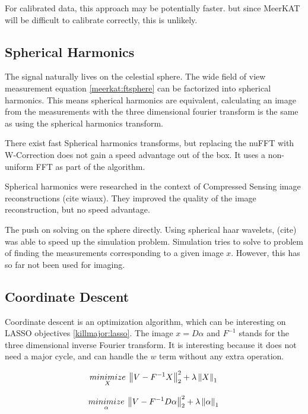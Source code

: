 For calibrated data, this approach may be potentially faster. but since MeerKAT will be difficult to calibrate correctly, this is unlikely.


\subsection{Spherical Harmonics}
The signal naturally lives on the celestial sphere. The wide field of view measurement equation \eqref{meerkat:ftsphere} can be factorized into spherical harmonics. This means spherical harmonics are equivalent, calculating an image from the measurements with the three dimensional fourier transform is the same as using the spherical harmonics transform.

There exist fast Spherical harmonics transforms, but replacing the nuFFT with W-Correction does not gain a speed advantage out of the box. It uses a non-uniform FFT as part of the algorithm.

Spherical harmonics were researched in the context of Compressed Sensing image reconstructions (cite wiaux). They improved the quality of the image reconstruction, but no speed advantage.

The push on solving on the sphere directly. Using spherical haar wavelets, (cite) was able to speed up the simulation problem. Simulation tries to solve to problem of finding the measurements corresponding to a given image $x$. However, this has so far not been used for imaging.


\subsection{Coordinate Descent}
Coordinate descent is an optimization algorithm, which can be interesting on LASSO objectives \eqref{killmajor:lasso}. The image $x = D\alpha$ and $F^{-1}$ stands for the three dimensional inverse Fourier transform. It is interesting because it does not need a major cycle, and can handle the $w$ term without any extra operation.


\begin{equation}\label{killmajor:lasso}
\underset{X}{minimize} \: \left \| V - F^{-1}X \right \|_2^2 + \lambda \left \| X \right \|_1 \\
\end{equation}

\begin{equation}
\underset{\alpha}{minimize} \: \left \| V - F^{-1}D \alpha \right \|_2^2 + \lambda \left \| \alpha \right \|_1 \\
\end{equation}

